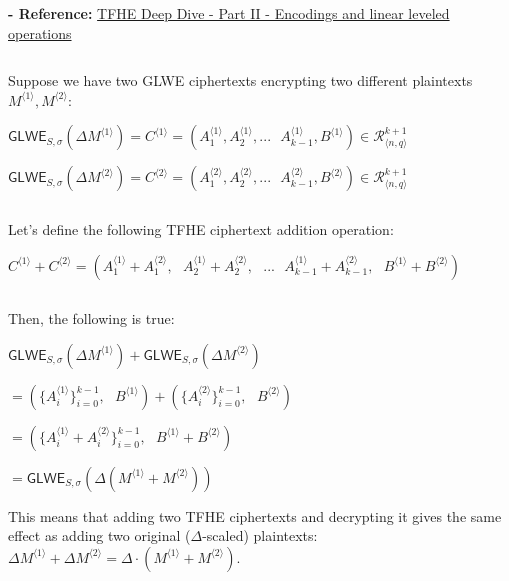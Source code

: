 \textbf{- Reference:} 
\href{https://www.zama.ai/post/tfhe-deep-dive-part-2}{TFHE Deep Dive - Part II - Encodings and linear leveled operations}~\cite{tfhe-2}


$ $

Suppose we have two GLWE ciphertexts encrypting two different plaintexts $M^{\langle 1 \rangle}, M^{\langle 2 \rangle}$:

$\textsf{GLWE}_{S, \sigma}(\Delta M^{\langle 1 \rangle} ) = C^{\langle 1 \rangle} = ( A_1^{\langle 1 \rangle}, A_2^{\langle 1 \rangle}, ... \text{ } A_{k-1}^{\langle 1 \rangle}, B^{\langle 1 \rangle}) \in \mathcal{R}_{\langle n,q \rangle}^{k + 1}$

$\textsf{GLWE}_{S, \sigma}(\Delta M^{\langle 2 \rangle} ) = C^{\langle 2 \rangle} = ( A_1^{\langle 2 \rangle}, A_2^{\langle 2 \rangle}, ... \text{ } A_{k-1}^{\langle 2 \rangle}, B^{\langle 2 \rangle}) \in \mathcal{R}_{\langle n,q \rangle}^{k + 1}$

$ $

\noindent Let's define the following TFHE ciphertext addition operation: 

$C^{\langle 1 \rangle} + C^{\langle 2 \rangle} = ( A_1^{\langle 1 \rangle} + A_1^{\langle 2 \rangle}, \text{ } A_2^{\langle 1 \rangle} + A_2^{\langle 2 \rangle}, \text{ } ... \text{ } A_{k-1}^{\langle 1 \rangle} + A_{k-1}^{\langle 2 \rangle}, \text{ } B^{\langle 1 \rangle} + B^{\langle 2 \rangle} )$

$ $

\noindent Then, the following is true:

\begin{tcolorbox}[title={\textbf{\tboxlabel{\ref*{sec:glwe-add-cipher}} GLWE Homomorphic Addition}}]
$\textsf{GLWE}_{S, \sigma}(\Delta M^{\langle 1 \rangle} ) + \textsf{GLWE}_{S, \sigma}(\Delta M^{\langle 2 \rangle} ) $

$ = ( \{A_i^{\langle 1 \rangle}\}_{i=0}^{k-1}, \text{ } B^{\langle 1 \rangle}) + (\{A_i^{\langle 2 \rangle}\}_{i=0}^{k-1}, \text{ } B^{\langle 2 \rangle}) $

$ = ( \{A_i^{\langle 1 \rangle} + A_i^{\langle 2 \rangle}\}_{i=0}^{k-1}, \text{ } B^{\langle 1 \rangle} + B^{\langle 2 \rangle} ) $

$= \textsf{GLWE}_{S, \sigma}(\Delta(M^{\langle 1 \rangle} + M^{\langle 2 \rangle}) )$
\end{tcolorbox}


This means that adding two TFHE ciphertexts and decrypting it gives the same effect as adding two original ($\Delta$-scaled) plaintexts: $\Delta M^{\langle 1 \rangle} + \Delta M^{\langle 2 \rangle} = \Delta \cdot (M^{\langle 1 \rangle} + M^{\langle 2 \rangle})$. 

